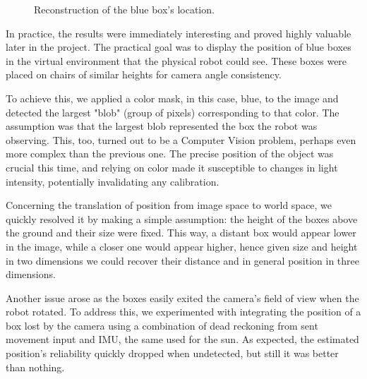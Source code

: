 \documentclass{Configuration_Files/PoliMi3i_thesis}
\begin{document}
\begin{figure}[H]
    \centering
    \quad
    \quad
    \caption{Reconstruction of the blue box's location.}
    \label{fig:blue_box}
\end{figure}

In practice, the results were immediately interesting and proved highly valuable later in the project. The practical goal was to display the position of blue boxes in the virtual environment that the physical robot could see. These boxes were placed on chairs of similar heights for camera angle consistency.

To achieve this, we applied a color mask, in this case, blue, to the image and detected the largest "blob" (group of pixels) corresponding to that color. The assumption was that the largest blob represented the box the robot was observing. This, too, turned out to be a Computer Vision problem, perhaps even more complex than the previous one. The precise position of the object was crucial this time, and relying on color made it susceptible to changes in light intensity, potentially invalidating any calibration.

Concerning the translation of position from image space to world space, we quickly resolved it by making a simple assumption: the height of the boxes above the ground and their size were fixed. This way, a distant box would appear lower in the image, while a closer one would appear higher, hence given size and height in two dimensions we could recover their distance and in general position in three dimensions.

Another issue arose as the boxes easily exited the camera's field of view when the robot rotated. To address this, we experimented with integrating the position of a box lost by the camera using a combination of dead reckoning from sent movement input and IMU, the same used for the sun. As expected, the estimated position's reliability quickly dropped when undetected, but still it was better than nothing.
\end{document}
